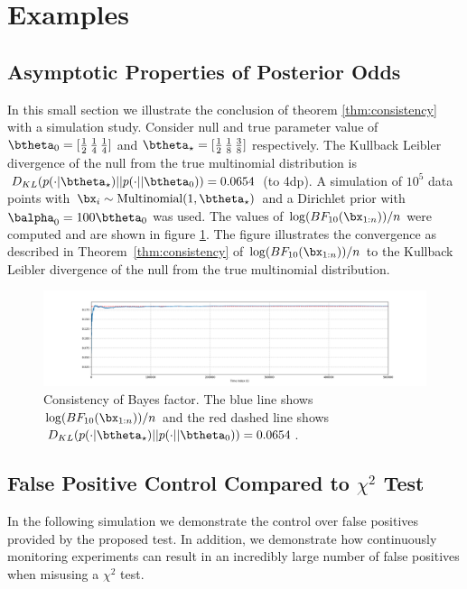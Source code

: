 \documentclass[11pt]{article}
\def\log{{\rm log}}
\begin{document}
\section{Examples}
\label{sec:simulation}
\subsection{Asymptotic Properties of Posterior Odds}
In this small section we illustrate the conclusion of theorem \ref{thm:consistency} with a simulation study.
Consider null and true parameter value of $\btheta_0=[\frac{1}{2}\, \frac{1}{4}\, \frac{1}{4}]$ and $\btheta_\star=[\frac{1}{2}\, \frac{1}{8}\, \frac{3}{8}]$ respectively.
The Kullback Leibler divergence of the null from the true multinomial distribution is $D_{KL}(p(\cdot|\btheta_\star)||p(\cdot||\btheta_0)) = 0.0654$ (to 4dp).
A simulation of $10^5$ data points with $\bx_i \sim \text{Multinomial}(1, \btheta_\star)$ and a Dirichlet prior with $\balpha_0 = 100\btheta_0$ was used.
The values of $\log(BF_{10}(\bx_{1:n}))/n$ were computed and are shown in figure \ref{fig:lbf}.
The figure illustrates the convergence as described in Theorem~\ref{thm:consistency} of $\log(BF_{10}(\bx_{1:n}))/n$ to the Kullback Leibler divergence of the null from the true multinomial distribution.
\begin{figure}[H]
  \centering
  \includegraphics[scale=0.35]{images/consistency.png}
  \caption{Consistency of Bayes factor.
The blue line shows $\log(BF_{10}(\bx_{1:n}))/n$ and the red dashed line shows $D_{KL}(p(\cdot|\btheta_\star)||p(\cdot||\btheta_0)) = 0.0654$.}
    \label{fig:lbf}
  \end{figure}
  \subsection{False Positive Control Compared to $\chi^2$ Test}
  In the following simulation we demonstrate the control over false positives provided by the proposed test.
  In addition, we demonstrate how continuously monitoring experiments can result in an incredibly large number of false positives when misusing a $\chi^2$ test.
\end{document}
